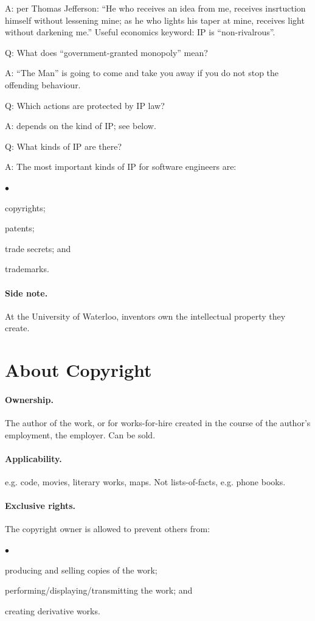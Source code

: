\documentclass[11pt]{article}
\newcommand{\squishlist}{
 \begin{list}{$\bullet$}
  { \setlength{\itemsep}{0pt}
     \setlength{\parsep}{3pt}
     \setlength{\topsep}{3pt}
     \setlength{\partopsep}{0pt}
     \setlength{\leftmargin}{1.5em}
     \setlength{\labelwidth}{1em}
     \setlength{\labelsep}{0.5em} } }
\newcommand{\squishend}{
  \end{list}  }
\begin{document}
\noindent
A: per Thomas Jefferson: ``He who receives an idea from me, receives insrtuction himself without lessening mine; as he who lights his taper at mine, receives light without darkening me.'' Useful economics keyword: IP is ``non-rivalrous''.

\noindent
Q: What does ``government-granted monopoly'' mean?

\noindent
A: ``The Man'' is going to come and take you away if you do
not stop the offending behaviour.

\noindent
Q: Which actions are protected by IP law?

\noindent
A: depends on the kind of IP; see below.

\newpage
\noindent
Q: What kinds of IP are there?

\noindent
A: The most important kinds of IP for software engineers are:
\squishlist
\item copyrights;
\item patents;
\item trade secrets; and
\item trademarks.
\squishend

\paragraph{Side note.} At the University of Waterloo, inventors own the intellectual property
they create.

\section*{About Copyright}

\paragraph{Ownership.} The author of the work, or for works-for-hire created in the
course of the author's employment, the employer. Can be sold.

\paragraph{Applicability.} e.g. code, movies, literary works, maps. Not lists-of-facts,
e.g. phone books.

\paragraph{Exclusive rights.} The copyright owner is allowed to prevent others from:
\squishlist
  \item producing and selling copies of the work;
  \item performing/displaying/transmitting the work; and
  \item creating derivative works.
\squishend
\end{document}
